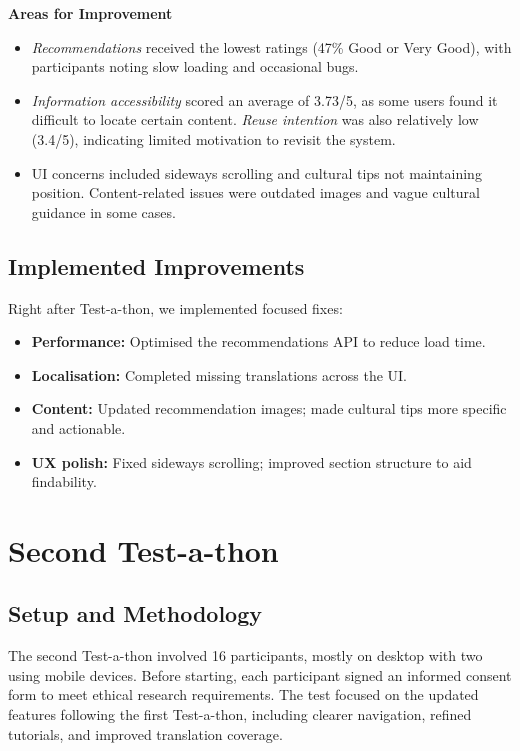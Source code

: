 \textbf{Areas for Improvement}
\begin{itemize}\itemsep0pt \parskip0pt
    \item \emph{Recommendations} received the lowest ratings (47\% Good or Very Good), with participants noting slow loading and occasional bugs. 
    \item \emph{Information accessibility} scored an average of 3.73/5, as some users found it difficult to locate certain content. \emph{Reuse intention} was also relatively low (3.4/5), indicating limited motivation to revisit the system. 
    \item UI concerns included sideways scrolling and cultural tips not maintaining position. Content-related issues were outdated images and vague cultural guidance in some cases. 
\end{itemize}


\subsection{Implemented Improvements}

\noindent Right after Test-a-thon, we implemented focused fixes:
\begin{itemize}\itemsep0pt \parskip0pt
  \item \textbf{Performance:} Optimised the recommendations API to reduce load time. 
  \item \textbf{Localisation:} Completed missing translations across the UI. 
  \item \textbf{Content:} Updated recommendation images; made cultural tips more specific and actionable. 
  \item \textbf{UX polish:} Fixed sideways scrolling; improved section structure to aid findability. 
\end{itemize}

\section{Second Test-a-thon}
\label{sec:testathon-two}

\subsection{Setup and Methodology}

The second Test-a-thon involved 16 participants, mostly on desktop with two using mobile devices. 
Before starting, each participant signed an informed consent form to meet ethical research requirements. 
The test focused on the updated features following the first Test-a-thon, including clearer navigation, 
refined tutorials, and improved translation coverage. 

